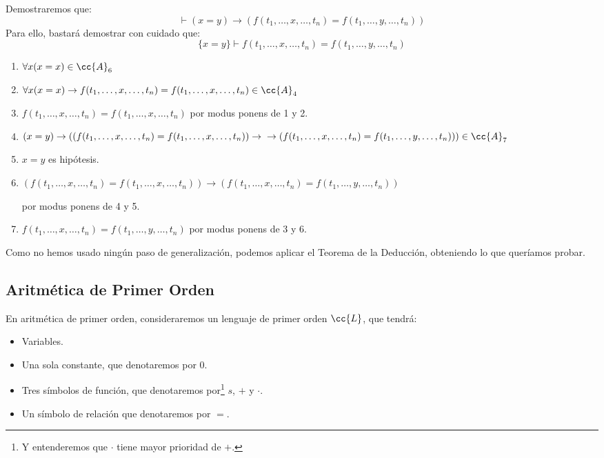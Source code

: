 \begin{ejemplo} %
    Demostraremos que:
    \begin{equation*}
        \vdash (x=y) \to (f(t_1,\ldots,x,\ldots,t_n) = f(t_1,\ldots,y,\ldots,t_n))
    \end{equation*}
    Para ello, bastará demostrar con cuidado que:
    \begin{equation*}
        \{x=y\} \vdash f(t_1,\ldots,x,\ldots,t_n) = f(t_1,\ldots,y,\ldots,t_n)
    \end{equation*}
    \begin{enumerate}
        \item $\forall x(x=x)\in \cc{A}_6$ 
        \item $\forall x(x=x)\to f(t_1,\dots,x,\dots,t_n)=f(t_1,\dots,x,\dots,t_n)\in \cc{A}_4$
        \item $f(t_1,\dots,x,\dots,t_n)=f(t_1,\dots,x,\dots,t_n)$ por modus ponens de 1 y 2.
        \item $(x=y)\to ((f(t_1,\dots,x,\dots,t_n)=f(t_1,\dots,x,\dots,t_n))\to \\ \to (f(t_1,\dots,x,\dots,t_n)=f(t_1,\dots,y,\dots,t_n))) \in \cc{A}_7$
        \item $x=y$ es hipótesis.
        \item $(f(t_1,\ldots,x,\ldots,t_n)=f(t_1,\ldots,x,\ldots,t_n))\to (f(t_1,\ldots,x,\ldots,t_n)=f(t_1,\ldots,y,\ldots,t_n))$ 

            por modus ponens de 4 y 5.
        \item $f(t_1,\ldots,x,\ldots,t_n)=f(t_1,\ldots,y,\ldots,t_n)$ por modus ponens de 3 y 6.
    \end{enumerate}
    Como no hemos usado ningún paso de generalización, podemos aplicar el Teorema de la Deducción, obteniendo lo que queríamos probar.
\end{ejemplo}

\subsection{Aritmética de Primer Orden}
En aritmética de primer orden, consideraremos un lenguaje de primer orden $\cc{L}$, que tendrá:
\begin{itemize}
    \item Variables.
    \item Una sola constante, que denotaremos por $0$.
    \item Tres símbolos de función, que denotaremos por\footnote{Y entenderemos que $\cdot $ tiene mayor prioridad de $+$.} $s$, $+$ y $\cdot $.
    \item Un símbolo de relación que denotaremos por $=$.
\end{itemize}


